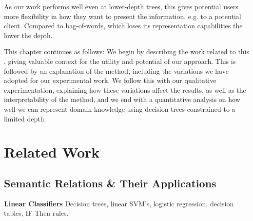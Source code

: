 








As our work performs well even at lower-depth trees, this gives potential users more flexibility in how they want to present the information, e.g. to a potential client. Compared to bag-of-words, which loses its representation capabilities the lower the depth.

This chapter continues as follows: We begin by describing the work related to this , giving valuable context for the utility and potential of our approach. This is followed by an explanation of the method, including the variations we have adopted for our experimental work. We follow this with our qualitative experimentation, explaining how these variations affect the results, as well as the interpretability of the method, and we end with a quantitative analysis on how well we can represent domain knowledge using decision trees constrained to a limited depth.



\section{Related Work}
\subsection{Semantic Relations \& Their Applications}
\textbf{Linear Classifiers}
Decision trees, linear SVM's, logistic regression, decision tables, IF Then rules.

